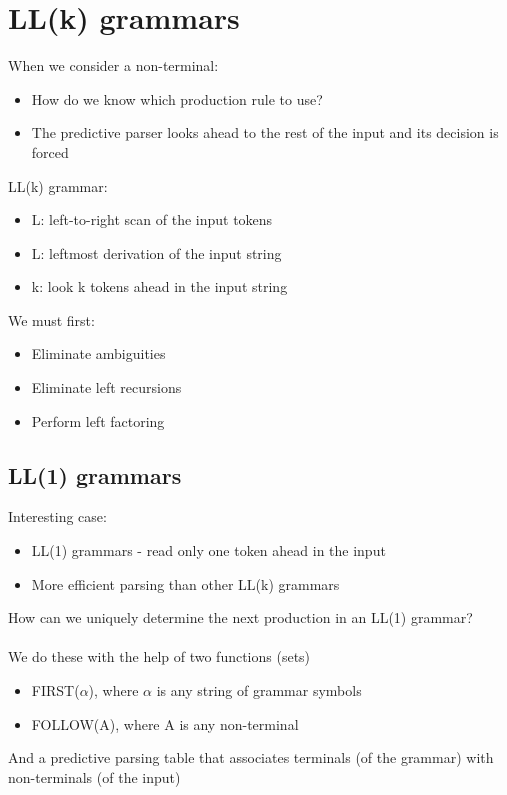 \documentclass{article}[18pt]
\begin{document}
\section{LL(k) grammars}
When we consider a non-terminal:
\begin{itemize}
	\item How do we know which production rule to use?
	\item The predictive parser looks ahead to the rest of the input and its decision is forced
\end{itemize}
LL(k) grammar:
\begin{itemize}
	\item L: left-to-right scan of the input tokens
	\item L: leftmost derivation of the input string
	\item k: look k tokens ahead in the input string
\end{itemize}
We must first:
\begin{itemize}
	\item Eliminate ambiguities
	\item Eliminate left recursions
	\item Perform left factoring
\end{itemize}
\subsection{LL(1) grammars}
Interesting case:
\begin{itemize}
	\item LL(1) grammars - read only one token ahead in the input
	\item More efficient parsing than other LL(k) grammars
\end{itemize}
How can we uniquely determine the next production in an LL(1) grammar?\\
\\
We do these with the help of two functions (sets)
\begin{itemize}
	\item FIRST($\alpha$), where $\alpha$ is any string of grammar symbols
	\item FOLLOW(A), where A is any non-terminal
\end{itemize}
And a predictive parsing table that associates terminals (of the grammar) with non-terminals (of the input)
\end{document}
